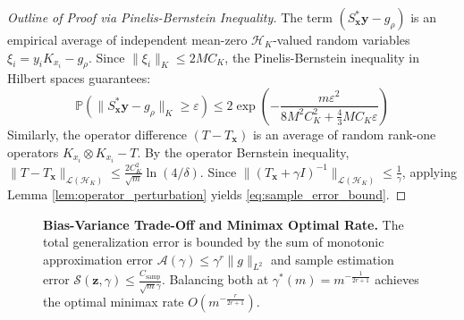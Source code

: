 \documentclass[11pt,a4paper]{article}
\theoremstyle{definition}
\begin{document}
\begin{proof}[Outline of Proof via Pinelis-Bernstein Inequality]
The term $(S_{\mathbf{x}}^* \mathbf{y} - g_\rho)$ is an empirical average of independent mean-zero $\mathcal{H}_K$-valued random variables $\xi_i = y_i K_{x_i} - g_\rho$. Since $\|\xi_i\|_K \le 2 M C_K$, the Pinelis-Bernstein inequality in Hilbert spaces guarantees:
\[
\mathbb{P}\left( \|S_{\mathbf{x}}^* \mathbf{y} - g_\rho\|_K \ge \varepsilon \right) \le 2 \exp\left( - \frac{m \varepsilon^2}{8 M^2 C_K^2 + \frac{4}{3} M C_K \varepsilon} \right)
\]
Similarly, the operator difference $(T - T_{\mathbf{x}})$ is an average of random rank-one operators $K_{x_i} \otimes K_{x_i} - T$. By the operator Bernstein inequality, $\|T - T_{\mathbf{x}}\|_{\mathcal{L}(\mathcal{H}_K)} \le \frac{2 C_K^2}{\sqrt{m}} \ln(4/\delta)$.
Since $\|(T_{\mathbf{x}} + \gamma I)^{-1}\|_{\mathcal{L}(\mathcal{H}_K)} \le \frac{1}{\gamma}$, applying Lemma \ref{lem:operator_perturbation} yields \eqref{eq:sample_error_bound}.
\end{proof}

\begin{figure}[htbp]
\centering
{}
\caption{\textbf{Bias-Variance Trade-Off and Minimax Optimal Rate.} The total generalization error is bounded by the sum of monotonic approximation error $\mathcal{A}(\gamma) \le \gamma^r \|g\|_{L^2}$ and sample estimation error $\mathcal{S}(\mathbf{z}, \gamma) \le \frac{C_{\text{samp}}}{\sqrt{m} \gamma}$. Balancing both at $\gamma^*(m) = m^{-\frac{1}{2r+1}}$ achieves the optimal minimax rate $O(m^{-\frac{r}{2r+1}})$.}
\label{fig:error_tradeoff}
\end{figure}
\end{document}
